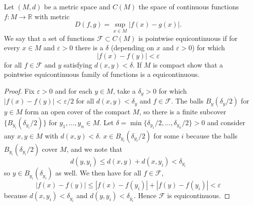 \documentclass{article}
\newcommand{\R}{\mathbb{R}}
\theoremstyle{definition} %
\numberwithin{thm}{section} %
\theoremstyle{definition} %
\begin{document}
\section{}

Let $(M, d)$ be a metric space and $C(M)$ the space of continuous functions
 $f: M \to \R$ with metric
\[
    D(f, g) = \sup_{x \in M}|f(x) - g(x)|.
\]
We say that a set of functions $\mathcal{F} \subset C(M)$ is pointwise 
equicontinuous if for every $x \in M$ and $\varepsilon > 0$ there is a 
$\delta$ (depending on $x$ and $\varepsilon > 0$) for which
\[
    |f(x) - f(y)| < \varepsilon
\]
for all $f \in \mathcal{F}$ and $y$ satisfying $d(x, y) < \delta$. 
If $M$ is compact show that a pointwise equicontinuous family of 
functions is a equicontinuous.

\begin{proof}
Fix $\varepsilon > 0$ and for each $y \in M$, take a $\delta_y > 0$ 
for which $|f(x) - f(y)| < \varepsilon/2$ for all $d(x, y) < \delta_y$ and
$f \in \mathcal{F}$.
The balls $B_y(\delta_y/2)$ for $y \in M$ form an open cover of the compact
$M$, so there is a finite subcover $\{B_{y_i}(\delta_{y_i}/2)\}$ for
$y_1, \dots, y_n \in M$. Let $\delta = 
\min\{\delta_{y_1}/2, \dots, \delta_{y_n}/2\} > 0$ and consider any 
$x, y \in M$ with $d(x, y) < \delta$. $x \in B_{y_i}(\delta_{y_i}/2)$
for some $i$ because the balls $B_{y_i}(\delta_{y_i}/2)$ cover $M$, and
we note that
\[
    d(y, y_i) \leq d(x, y) + d(x, y_i) < \delta_{y_i}
\] 
so $y \in B_{y_i}(\delta_{y_i})$ as well. We then have for all 
$f \in \mathcal{F}$,
\[
    |f(x) - f(y)| \leq |f(x) - f(y_i)| + |f(y) - f(y_i)| < \varepsilon
\]
because $d(x, y_i) < \delta_{y_i}$ and $d(y, y_i) < \delta_{y_i}$. Hence
$\mathcal{F}$ is equicontinuous.
\end{proof}

\section{}
\end{document}
